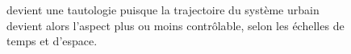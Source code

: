 \begin{figure}[h!]
\begin{mdframed}
devient une tautologie puisque la trajectoire du système urbain devient alors l'aspect plus ou moins contrôlable, selon les échelles de temps et d'espace.



\medskip

\end{mdframed}
\end{figure}



